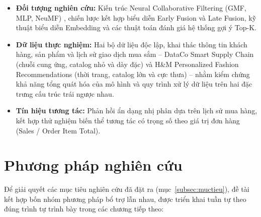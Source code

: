 \begin{itemize}
    \item \textbf{Đối tượng nghiên cứu:} Kiến trúc Neural Collaborative Filtering (GMF, MLP, NeuMF) \parencite{he2017ncf}, chiến lược kết hợp biểu diễn Early Fusion và Late Fusion, kỹ thuật biểu diễn Embedding và các thuật toán đánh giá hệ thống gợi ý Top-K.
    \item \textbf{Dữ liệu thực nghiệm:} Hai bộ dữ liệu độc lập, khai thác thông tin khách hàng, sản phẩm và lịch sử giao dịch mua sắm -- DataCo Smart Supply Chain \parencite{dataco2019} (chuỗi cung ứng, catalog nhỏ và dày đặc) và H\&M Personalized Fashion Recommendations (thời trang, catalog lớn và cực thưa) -- nhằm kiểm chứng khả năng tổng quát hóa của mô hình và quy trình xử lý dữ liệu trên hai đặc trưng cấu trúc trái ngược nhau.
    \item \textbf{Tín hiệu tương tác:} Phản hồi ẩn dạng nhị phân dựa trên lịch sử mua hàng, kết hợp thử nghiệm biến thể tương tác có trọng số theo giá trị đơn hàng (Sales / Order Item Total).
\end{itemize}

\section{Phương pháp nghiên cứu}
\label{sec:phuongphap}

Để giải quyết các mục tiêu nghiên cứu đã đặt ra (mục~\ref{subsec:muctieu}), đề tài kết hợp bốn nhóm phương pháp bổ trợ lẫn nhau, được triển khai tuần tự theo đúng trình tự trình bày trong các chương tiếp theo:

